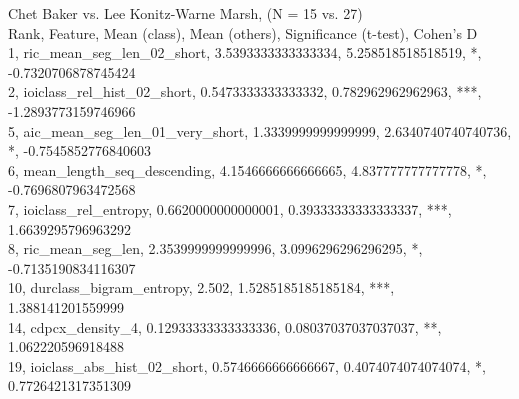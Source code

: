 Chet Baker vs. Lee Konitz-Warne Marsh, (N = 15 vs. 27)\\
Rank, Feature, Mean (class), Mean (others), Significance (t-test), Cohen's D\\
1, ric_mean_seg_len_02_short, 3.5393333333333334, 5.258518518518519, *, -0.7320706878745424\\
2, ioiclass_rel_hist_02_short, 0.5473333333333332, 0.782962962962963, ***, -1.2893773159746966\\
5, aic_mean_seg_len_01_very_short, 1.3339999999999999, 2.6340740740740736, *, -0.7545852776840603\\
6, mean_length_seq_descending, 4.1546666666666665, 4.837777777777778, *, -0.7696807963472568\\
7, ioiclass_rel_entropy, 0.6620000000000001, 0.39333333333333337, ***, 1.6639295796963292\\
8, ric_mean_seg_len, 2.3539999999999996, 3.0996296296296295, *, -0.7135190834116307\\
10, durclass_bigram_entropy, 2.502, 1.5285185185185184, ***, 1.388141201559999\\
14, cdpcx_density_4, 0.12933333333333336, 0.08037037037037037, **, 1.062220596918488\\
19, ioiclass_abs_hist_02_short, 0.5746666666666667, 0.4074074074074074, *, 0.7726421317351309\\
